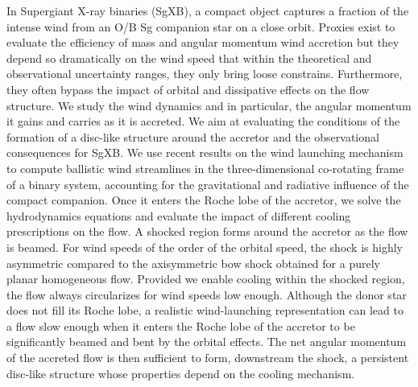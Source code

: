 \documentclass{aa}
\newcommand{\sgx}{SgXB\xspace}
\begin{document}
  \abstract
   {In Supergiant X-ray binaries (\sgx), a compact object captures a fraction of the intense wind from an O/B Sg companion star on a close orbit. Proxies exist to evaluate the efficiency of mass and angular momentum wind accretion but they depend so dramatically on the wind speed that within the theoretical and observational uncertainty ranges, they only bring loose constrains. Furthermore, they often bypass the impact of orbital and dissipative effects on the flow structure.
}
   {We study the wind dynamics and in particular, the angular momentum it gains and carries as it is accreted. We aim at evaluating the conditions of the formation of a disc-like structure around the accretor and the observational consequences for \sgx. 
}
   {We use recent results on the wind launching mechanism to compute ballistic wind streamlines in the three-dimensional co-rotating frame of a binary system, accounting for the gravitational and radiative influence of the compact companion. Once it enters the Roche lobe of the accretor, we solve the hydrodynamics equations and evaluate the impact of different cooling prescriptions on the flow.}
   {A shocked region forms around the accretor as the flow is beamed. For wind speeds of the order of the orbital speed, the shock is highly asymmetric compared to the axisymmetric bow shock obtained for a purely planar homogeneous flow. Provided we enable cooling within the shocked region, the flow always circularizes for wind speeds low enough.
}
   {Although the donor star does not fill its Roche lobe, a realistic wind-launching representation can lead to a flow slow enough when it enters the Roche lobe of the accretor to be significantly beamed and bent by the orbital effects. The net angular momentum of the accreted flow is then sufficient to form, downstream the shock, a persistent disc-like structure whose properties depend on the cooling mechanism.
}


   \maketitle
%
\end{document}
